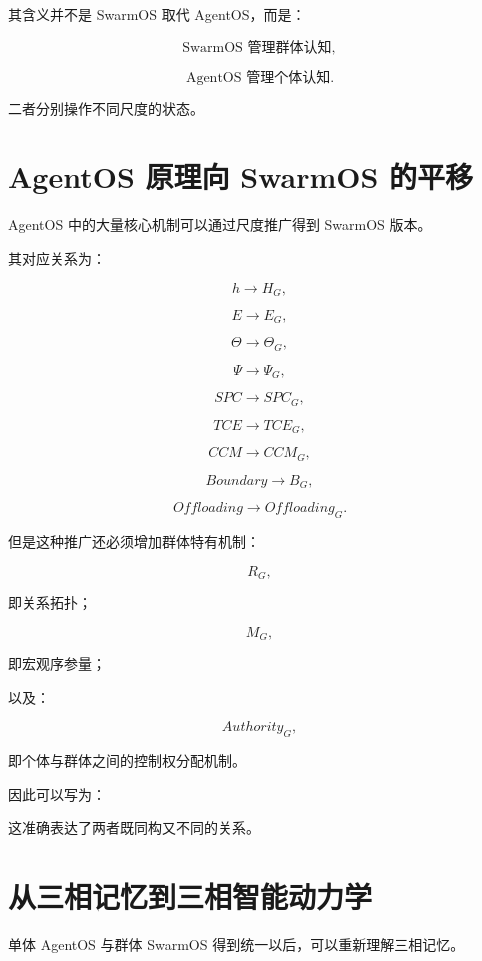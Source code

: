 其含义并不是 SwarmOS 取代 AgentOS，而是：

\[
\text{SwarmOS 管理群体认知},
\]

\[
\text{AgentOS 管理个体认知}.
\]

二者分别操作不同尺度的状态。


\section{AgentOS 原理向 SwarmOS 的平移}

AgentOS 中的大量核心机制可以通过尺度推广得到 SwarmOS 版本。

其对应关系为：

\[
h
\rightarrow
H_G,
\]

\[
E
\rightarrow
E_G,
\]

\[
\Theta
\rightarrow
\Theta_G,
\]

\[
\Psi
\rightarrow
\Psi_G,
\]

\[
SPC
\rightarrow
SPC_G,
\]

\[
TCE
\rightarrow
TCE_G,
\]

\[
CCM
\rightarrow
CCM_G,
\]

\[
Boundary
\rightarrow
B_G,
\]

\[
Offloading
\rightarrow
Offloading_G.
\]

但是这种推广还必须增加群体特有机制：

\[
R_G,
\]

即关系拓扑；

\[
M_G,
\]

即宏观序参量；

以及：

\[
Authority_G,
\]

即个体与群体之间的控制权分配机制。

因此可以写为：

\begin{statementbox}
\centering
{}
\end{statementbox}

这准确表达了两者既同构又不同的关系。


\section{从三相记忆到三相智能动力学}

单体 AgentOS 与群体 SwarmOS 得到统一以后，可以重新理解三相记忆。

